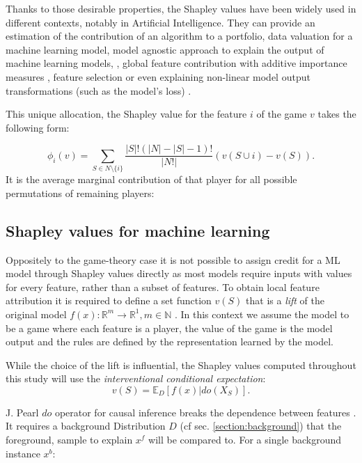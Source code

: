 \documentclass[runningheads]{llncs}
\begin{document}
    Thanks to those desirable properties, the Shapley values have been widely used in different contexts, notably in Artificial Intelligence. They can provide an estimation of the contribution of an algorithm to a portfolio, data valuation for a machine learning model, model agnostic approach to explain the output of machine learning models, \cite{NIPS2017_7062},
    global feature contribution with additive importance measures \cite{SAGE_covert}, feature selection or even explaining non-linear model output transformations (such as the model’s loss) \cite{lundberg2020local2global}.
    
    This unique allocation, the Shapley value for the feature $i$ of the game $v$ takes the following form:
    

    \begin{equation}
        \phi_i(v) = \sum_{S \in N \setminus \{i\}}\frac{|S|! (|N|-|S|-1)!}{|N!|} {(v(S \cup i) - v(S))}.
    \end{equation}
    It is the average marginal contribution of that player for all possible permutations of remaining players:
    
    \subsection{Shapley values for machine learning}
    
    Oppositely to the game-theory case it is not possible to assign credit for a ML model through Shapley values directly as most models require inputs with values for every feature, rather than a subset of features. %
    To obtain local feature attribution it is required to define a set function $v(S)$ that is a \emph{lift} of the original model $f(x):\mathbb{R}^m\rightarrow\mathbb{R}^1, m\in \mathbb{N}$ \cite{Merrill2019GeneralizedIG,Chen_attributions}.
    In this context we assume the model to be a game where each feature is a player, the value of the game is the model output and the rules are defined by the representation learned by the model. 

    \noindent While the choice of the lift is influential, the Shapley values computed throughout this study will use the 
    \emph{interventional conditional expectation}:
    \begin{equation}
        v(S) = \mathbb{E}_D[f(x)|do(X_S)].
    \end{equation}

    
    \noindent J. Pearl $do$ operator for causal inference breaks the dependence between features \cite{Janzing2020FeatureRQ}. It requires a background Distribution $D$ (cf sec. \ref{section:background}) that the foreground, sample to explain $x^f$ will be compared to. For a single background instance $x^b$:
    
\end{document}
